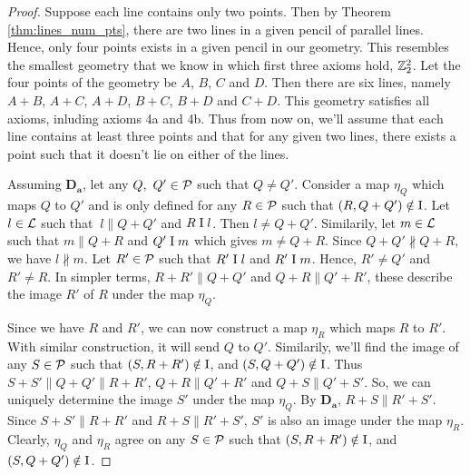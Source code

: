 \begin{proof}
    Suppose each line contains only two points. Then by Theorem \ref{thm:lines_num_pts}, there are two lines in a given pencil of parallel lines. Hence, only four points exists in a given pencil in our geometry. This resembles the smallest geometry that we know in which first three axioms hold, $\mathbb{Z}_2^2$. Let the four points of the geometry be $A$, $B$, $C$ and $D$. Then there are six lines, namely $A+B$, $A+C$, $A+D$, $B+C$, $B+D$ and $C+D$. This geometry satisfies all axioms, inluding axioms 4a and 4b. Thus from now on, we'll assume that each line contains at least three points and that for any given two lines, there exists a point such that it doesn't lie on either of the lines.
 
    Assuming $\mathbf{D_a}$, let any $Q, \ Q' \in \mathcal{P}$ such that $Q \neq Q'$. Consider a map $\eta_Q$ which maps $Q$ to $Q'$ and is only defined for any $R \in \mathcal{P}$ such that $(R,Q+Q') \notin \text{I}$. Let $l \in \mathcal{L}$ such that $\ l \parallel Q+Q'$ and $R\mathrel\text{I} l$. Then $l \neq Q+Q'$. Similarily, let $m \in \mathcal{L}$ such that $m \parallel Q+R$ and $Q' \mathrel\text{I} m$ which gives $m \neq Q+R$. Since $Q+Q' \not \parallel Q+R,$ we have $l \not \parallel m$. Let $R' \in \mathcal{P}$ such that $R' \mathrel\text{I} l$ and $R' \mathrel\text{I} m$. Hence, $R' \neq Q'$ and $R' \neq R$. In simpler terms, $R+R' \parallel Q+Q'$ and $Q+R \parallel Q' + R'$, these describe the image $R'$ of $R$ under the map $\eta_Q.$

    \begin{figure}[H]
        \begin{center}
        \end{center}
        \caption{}
    \end{figure}

    Since we have $R$ and $R'$, we can now construct a map $\eta_R$ which maps $R$ to $R'$. With similar construction, it will send $Q$ to $Q'$. Similarily, we'll find the image of any $S \in \mathcal{P}$ such that $(S, R+R') \notin \text{I}$, and $(S, Q+Q') \notin \text{I}$. Thus $S+S' \parallel Q+Q' \parallel R+R'$, $Q+R \parallel Q'+R'$ and $Q+S \parallel Q'+S'$. So, we can uniquely determine the image $S'$ under the map $\eta_Q$. By $\mathbf{D_a}$, $R+S \parallel  R'+S'$. Since $S+S' \parallel R+R'$ and $R+S \parallel  R'+S'$, $S'$ is also an image under the map $\eta_R$. Clearly, $\eta_Q$ and $\eta_R$ agree on any $S \in \mathcal{P}$ such that $(S, R+R') \notin \text{I}$, and $(S, Q+Q') \notin \text{I}$.


\end{proof}
